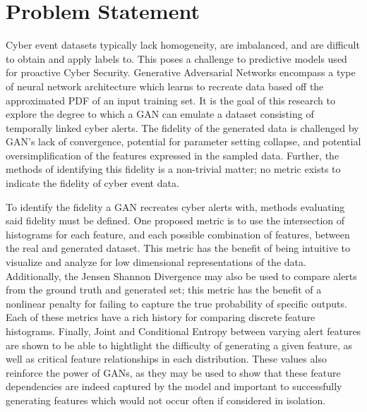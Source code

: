 \section{Problem Statement}

Cyber event datasets typically lack homogeneity, are imbalanced, and are difficult to obtain and apply labels to. This poses a challenge to predictive models used for proactive Cyber Security. Generative Adversarial Networks encompass a type of neural network architecture which learns to recreate data based off the approximated PDF of an input training set. It is the goal of this research to explore the degree to which a GAN can emulate a dataset consisting of temporally linked cyber alerts. The fidelity of the generated data is challenged by GAN’s lack of convergence, potential for parameter setting collapse, and potential oversimplification of the features expressed in the sampled data. Further, the methods of identifying this fidelity is a non-trivial matter; no metric exists to indicate the fidelity of cyber event data. 

To identify the fidelity a GAN recreates cyber alerts with, methods evaluating said fidelity must be defined. One proposed metric is to use the intersection of histograms for each feature, and each possible combination of features, between the real and generated dataset. This metric has the benefit of being intuitive to visualize and analyze for low dimensional representations of the data. Additionally, the Jensen Shannon Divergence may also be used to compare alerts from the ground truth and generated set; this metric has the benefit of a nonlinear penalty for failing to capture the true probability of specific outputs. Each of these metrics have a rich history for comparing discrete feature histograms. Finally, Joint and Conditional Entropy between varying alert features are shown to be able to hightlight the difficulty of generating a given feature, as well as critical feature relationships in each distribution. These values also reinforce the power of GANs, as they may be used to show that these feature dependencies are indeed captured by the model and important to successfully generating features which would not occur often if considered in isolation. 

